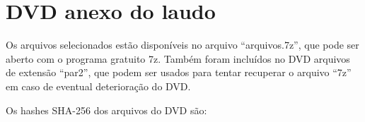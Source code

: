 \section{DVD anexo do laudo}
Os arquivos selecionados estão disponíveis no arquivo ``arquivos.7z'', que pode ser aberto com o programa gratuito 7z. Também foram incluídos no DVD arquivos de extensão ``par2'', que podem ser usados para tentar recuperar o arquivo ``7z'' em caso de eventual deterioração do DVD.

Os hashes SHA-256 dos arquivos do DVD são:
\begin{clean}
	\scriptsize\textbox{\texttt{
	}}
\end{clean}
